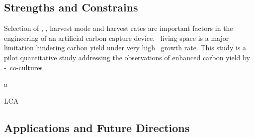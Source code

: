\documentclass[../thesis.tex]{subfiles} %
\begin{document}
\subsection{Strengths and Constrains}
Selection of \phy, \bac, harvest mode and harvest rates are important factors in the engineering of an artificial carbon capture device.  \Phy\ living space is a major limitation hindering carbon yield under very high \phy\ growth rate.  This study is a pilot quantitative study addressing the observations of enhanced carbon yield by \phy-\bac\ co-cultures \autocite{fuentes2016impact,santos2014microalgal}.

a

LCA

\subsection{Applications and Future Directions}
\end{document}
